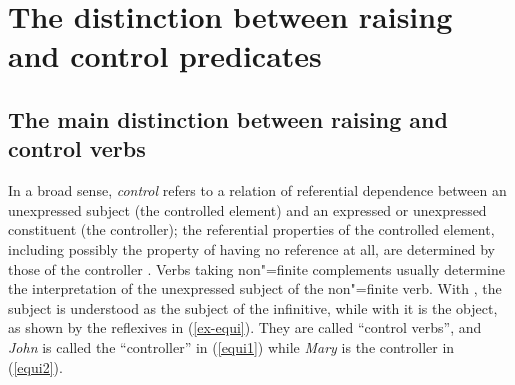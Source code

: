 



\maketitle
\label{chap-control-raising}



\section{The distinction between raising and control predicates}
\label{sec-distinction-raising-control}

\subsection{The main distinction between raising and control verbs}

In a broad sense, \emph{control} refers to a relation of referential dependence between an unexpressed
subject (the controlled element) and an expressed or unexpressed constituent (the controller); the
referential properties of the controlled element, including possibly the property of having no
reference at all,
are determined by those of the controller \citep[372]{Bresnan1982}. Verbs taking
non"=finite complements usually determine the interpretation of the unexpressed subject of the
non"=finite verb. With , the subject is understood as the subject of the infinitive,
while with  it is the object, as shown by the reflexives in (\ref{ex-equi}). They are
called ``control verbs'', and \emph{John} is called the ``controller'' in (\ref{equi1}) while
\emph{Mary} is the controller in (\ref{equi2}).  

